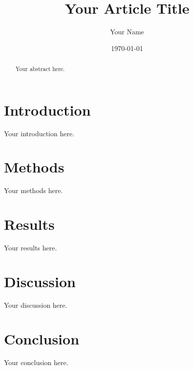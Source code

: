 \documentclass{article}
\title{Your Article Title}
\author{Your Name}
\date{\today}
\begin{document}
\maketitle

\begin{abstract}
Your abstract here.
\end{abstract}

\section{Introduction}
Your introduction here.

\section{Methods}
Your methods here.

\section{Results}
Your results here.

\section{Discussion}
Your discussion here.

\section{Conclusion}
Your conclusion here.



\end{document}
